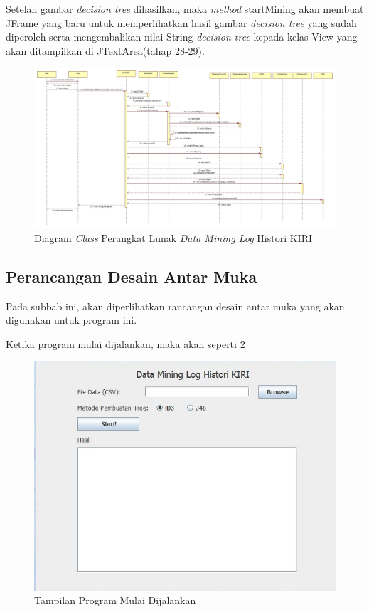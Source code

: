 Setelah gambar \textsl{decision tree} dihasilkan, maka \textsl{method} startMining akan membuat JFrame yang baru untuk memperlihatkan hasil gambar \textsl{decision tree} yang sudah diperoleh serta mengembalikan nilai String \textsl{decision tree} kepada kelas View yang akan ditampilkan di JTextArea(tahap 28-29).


\begin{figure}[H]
\includegraphics[scale=0.35, angle =90]{Gambar/sequenceDiagram.jpg}
\caption[Diagram \textsl{Class} Perangkat Lunak \textsl{Data Mining Log} Histori KIRI]{Diagram \textsl{Class} Perangkat Lunak \textsl{Data Mining Log} Histori KIRI} 
\label{fig:sequenceDiagram}
\end{figure}

\subsection{Perancangan Desain Antar Muka}

Pada subbab ini, akan diperlihatkan rancangan desain antar muka yang akan digunakan untuk program ini.

Ketika program mulai dijalankan, maka akan seperti \ref{fig:GUI1}
\begin{figure}[H]
\centering
\includegraphics[scale=0.7]{Gambar/GUI1.jpg}
\caption[Tampilan Program Mulai Dijalankan]{Tampilan Program Mulai Dijalankan} 
\label{fig:GUI1}
\end{figure}

